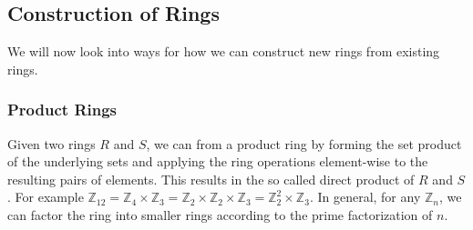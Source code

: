 








\subsection{Construction of Rings}
We will now look into ways for how we can construct new rings from existing rings. 


\subsubsection{Product Rings}
Given two rings $R$ and $S$, we can from a product ring by forming the set product of the underlying sets and applying the ring operations element-wise to the resulting pairs of elements. This results in the so called direct product of $R$ and $S$. For example $\mathbb{Z}_{12} = \mathbb{Z}_4 \times \mathbb{Z}_3 = \mathbb{Z}_2 \times \mathbb{Z}_2 \times \mathbb{Z}_3 = \mathbb{Z}_2^2 \times \mathbb{Z}_3$. In general, for any $\mathbb{Z}_n$, we can factor the ring into smaller rings according to the prime factorization of $n$.

